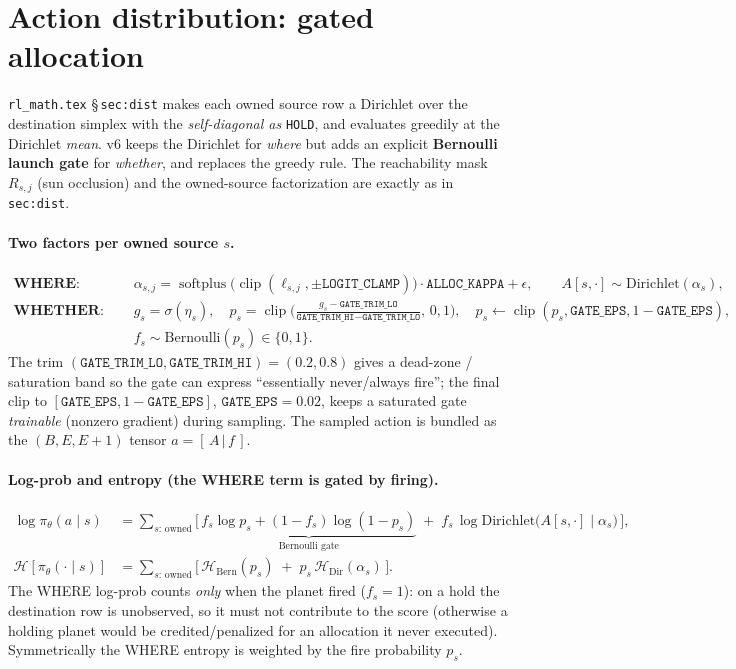 \documentclass[11pt]{article}
\newcommand{\pol}{\pi_\theta}
\newcommand{\softplus}{\operatorname{softplus}}
\newcommand{\clip}{\operatorname{clip}}
\newcommand{\cd}[1]{\texttt{#1}}
\begin{document}
\section{Action distribution: gated allocation}\label{v6:dist}
\texttt{rl\_math.tex} \S\,\texttt{sec:dist} makes each owned source row a Dirichlet over the destination
simplex with the \emph{self-diagonal as} \cd{HOLD}, and evaluates greedily at the Dirichlet \emph{mean}.
v6 keeps the Dirichlet for \emph{where} but adds an explicit \textbf{Bernoulli launch gate} for
\emph{whether}, and replaces the greedy rule. The reachability mask $R_{s,j}$ (sun occlusion) and the
owned-source factorization are exactly as in \texttt{sec:dist}.

\paragraph{Two factors per owned source $s$.}
\begin{align}
\textbf{WHERE: }\quad & \alpha_{s,j}=\softplus\!\big(\clip(\ell_{s,j},\pm \cd{LOGIT\_CLAMP})\big)\cdot\cd{ALLOC\_KAPPA}+\epsilon,
   \qquad A[s,\cdot]\sim\mathrm{Dirichlet}(\alpha_s),\\[2pt]
\textbf{WHETHER: }\quad & g_s=\sigma(\eta_s),\quad
   p_s=\clip\!\Big(\tfrac{g_s-\cd{GATE\_TRIM\_LO}}{\cd{GATE\_TRIM\_HI}-\cd{GATE\_TRIM\_LO}},\,0,1\Big),\quad
   p_s\leftarrow\clip(p_s,\cd{GATE\_EPS},1-\cd{GATE\_EPS}),\\
   & f_s\sim\mathrm{Bernoulli}(p_s)\in\{0,1\}.
\end{align}
The trim $(\cd{GATE\_TRIM\_LO},\cd{GATE\_TRIM\_HI})=(0.2,0.8)$ gives a dead-zone / saturation band so the
gate can express ``essentially never/always fire''; the final clip to $[\cd{GATE\_EPS},1{-}\cd{GATE\_EPS}]$,
$\cd{GATE\_EPS}=0.02$, keeps a saturated gate \emph{trainable} (nonzero gradient) during sampling. The
sampled action is bundled as the $(B,E,E{+}1)$ tensor $a=[\,A\,|\,f\,]$.

\paragraph{Log-prob and entropy (the WHERE term is gated by firing).}
\begin{align}
\log\pol(a\mid s) &= \!\!\sum_{s:\,\text{owned}}\!\!\Big[\,\underbrace{f_s\log p_s+(1{-}f_s)\log(1{-}p_s)}_{\text{Bernoulli gate}}
   \;+\; f_s\,\log\mathrm{Dirichlet}\big(A[s,\cdot]\mid\alpha_s\big)\,\Big],\\
\mathcal H[\pol(\cdot\mid s)] &= \!\!\sum_{s:\,\text{owned}}\!\!\Big[\,\mathcal H_{\mathrm{Bern}}(p_s)
   \;+\; p_s\,\mathcal H_{\mathrm{Dir}}(\alpha_s)\,\Big].
\end{align}
The WHERE log-prob counts \emph{only} when the planet fired ($f_s{=}1$): on a hold the destination row is
unobserved, so it must not contribute to the score (otherwise a holding planet would be credited/penalized
for an allocation it never executed). Symmetrically the WHERE entropy is weighted by the fire probability
$p_s$.
\end{document}
